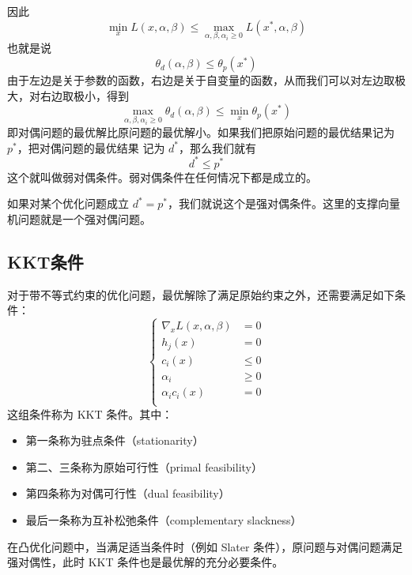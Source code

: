 因此
\begin{equation}
\min_x L(x, \alpha,\beta) \leqslant 
\max_{\alpha, \beta, \alpha_i\geqslant0}L(x^{*}, \alpha, \beta)
\end{equation}
也就是说
\begin{equation}
\theta_d(\alpha, \beta)\leqslant
\theta_p(x^{*})
\end{equation}
由于左边是关于参数的函数，右边是关于自变量的函数，从而我们可以对左边取极大，对右边取极小，得到
\begin{equation}
\max_{\alpha, \beta, \alpha_i\geqslant0} \theta_d(\alpha,\beta)
\leqslant \min_x\theta_p(x^{*})
\end{equation}
即对偶问题的最优解比原问题的最优解小。如果我们把原始问题的最优结果记为 $p^{*}$，把对偶问题的最优结果
记为 $d^{*}$，那么我们就有
\begin{equation}
d^{*}\leqslant p^{*}
\end{equation}
这个就叫做弱对偶条件。弱对偶条件在任何情况下都是成立的。

如果对某个优化问题成立 $d^*=p^*$，我们就说这个是强对偶条件。这里的支撑向量机问题就是一个强对偶问题。

\subsection{KKT条件}
 
对于带不等式约束的优化问题，最优解除了满足原始约束之外，还需要满足如下条件：
\begin{equation}
\begin{cases}
\nabla_x L(x,\alpha,\beta)&=0 \\
h_j(x) &=0 \\
c_i(x) &\leqslant 0\\
\alpha_i & \geqslant 0\\
\alpha_ic_i(x)&= 0 \\
\end{cases}
\end{equation}
这组条件称为 KKT 条件。其中：
 
\begin{itemize}
\item 第一条称为驻点条件（stationarity）
\item 第二、三条称为原始可行性（primal feasibility）
\item 第四条称为对偶可行性（dual feasibility）
\item 最后一条称为互补松弛条件（complementary slackness）
\end{itemize}
在凸优化问题中，当满足适当条件时（例如 Slater 条件），原问题与对偶问题满足强对偶性，此时 KKT 条件也是最优解的充分必要条件。

